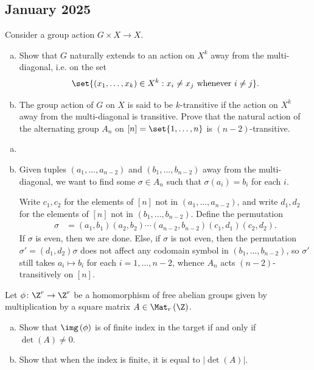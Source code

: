 \documentclass[10pt]{mypackage}
\begin{document}
\subsection{January 2025}%
\begin{problem}[Problem 2]
  Consider a group action $G\times X\rightarrow X$.
  \begin{enumerate}[(a)]
    \item Show that $G$ naturally extends to an action on $X^{k}$ away from the multi-diagonal, i.e. on the set
      \begin{align*}
        \set{\left( x_1,\dots,x_k \right)\in X^{k} : x_i\neq x_j \text{ whenever }i\neq j}.
      \end{align*}
    \item The group action of $G$ on $X$ is said to be $k$-transitive if the action on $X^{k}$ away from the multi-diagonal is transitive. Prove that the natural action of the alternating group $A_n$ on $[n] = \set{1,\dots,n}$ is $\left( n-2 \right)$-transitive.
  \end{enumerate}
\end{problem}
\begin{solution}\hfill
  \begin{enumerate}[(a)]
    \item 
    \item Given tuples $\left( a_1,\dots,a_{n-2} \right)$ and $\left( b_1,\dots,b_{n-2} \right)$ away from the multi-diagonal, we want to find some $\sigma\in A_n$ such that $\sigma\left( a_i \right) = b_i$ for each $i$.

      Write $c_1,c_2$ for the elements of $[n]$ not in $\left( a_1,\dots,a_{n-2} \right)$, and write $d_1,d_2$ for the elements of $[n]$ not in $\left( b_1,\dots,b_{n-2} \right)$. Define the permutation
      \begin{align*}
        \sigma &= \left( a_1,b_1 \right)\left( a_2,b_2 \right)\cdots \left( a_{n-2},b_{n-2} \right)\left( c_1,d_1 \right)\left( c_2,d_2 \right).
      \end{align*}
      If $\sigma$ is even, then we are done. Else, if $\sigma$ is not even, then the permutation $\sigma' = \left( d_1,d_2 \right)\sigma$ does not affect any codomain symbol in $\left( b_1,\dots,b_{n-2} \right)$, so $\sigma'$ still takes $a_i\mapsto b_i$ for each $i=1,\dots,n-2$, whence $A_n$ acts $\left( n-2 \right)$-transitively on $[n]$.
  \end{enumerate}
\end{solution}
\begin{problem}[Problem 4]
  Let $\phi\colon \Z^r\rightarrow \Z^r$ be a homomorphism of free abelian groups given by multiplication by a square matrix $A\in \Mat_r\left( \Z \right)$.
  \begin{enumerate}[(a)]
    \item Show that $\img\left( \phi \right)$ is of finite index in the target if and only if $\det\left( A \right)\neq 0$.
    \item Show that when the index is finite, it is equal to $\left\vert \det\left( A \right) \right\vert$.
  \end{enumerate}
\end{problem}
\end{document}
